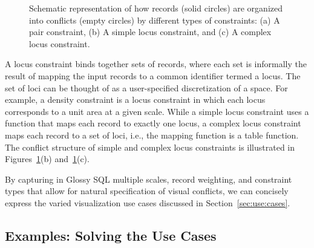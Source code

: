 \documentclass[11pt, oneside]{report}
\begin{document}
{\begin{figure}[t]
\centering
{}
\vspace{-2ex}
\caption{Schematic representation of how records (solid circles) are organized into conflicts (empty circles) by different types of constraints: (a) A pair constraint, (b) A simple locus constraint, and (c) A complex locus constraint.} 
\label{fig:constraints:schematic}
\vspace{-2ex}
\end{figure}

A locus constraint binds together sets of records, where each set is informally the result of mapping the input records to a common identifier termed a locus. The set of loci can be thought of as a user-specified discretization of a space. For example, a density constraint is a locus constraint in which each locus corresponds to a unit area at a given scale. While a simple locus constraint uses a function that maps each record to exactly one locus, a complex locus constraint maps each record to a set of loci, i.e., the mapping function is a table function. The conflict structure of simple and complex locus constraints is illustrated in Figures~\ref{fig:constraints:schematic}(b) and~\ref{fig:constraints:schematic}(c).

By capturing in Glossy SQL multiple scales, record weighting, and constraint types that allow for natural specification of visual conflicts, we can concisely express the varied visualization use cases discussed in Section~\ref{sec:use:cases}.

\subsection{Examples: Solving the Use Cases}
\label{sec:use:cases:solved}

}
\end{document}
